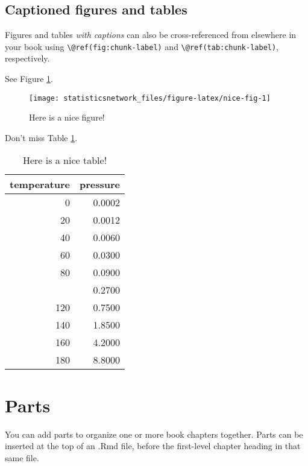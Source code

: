 \documentclass[
]{article}
\theoremstyle{definition}
\theoremstyle{definition}
\theoremstyle{definition}
\theoremstyle{definition}
\theoremstyle{remark}
\begin{document}
\hypertarget{captioned-figures-and-tables}{%
\subsection{Captioned figures and tables}\label{captioned-figures-and-tables}}

Figures and tables \emph{with captions} can also be cross-referenced from elsewhere in your book using \texttt{\textbackslash{}@ref(fig:chunk-label)} and \texttt{\textbackslash{}@ref(tab:chunk-label)}, respectively.

See Figure \ref{fig:nice-fig}.

\begin{figure}

{\centering \texttt{[image: statisticsnetwork\_files/figure-latex/nice-fig-1]} 

}

\caption{Here is a nice figure!}\label{fig:nice-fig}
\end{figure}

Don't miss Table \ref{tab:nice-tab}.

\begin{table}

\caption{\label{tab:nice-tab}Here is a nice table!}
\centering
\begin{tabular}[t]{rr}
\toprule
temperature & pressure\\
\midrule
0 & 0.0002\\
20 & 0.0012\\
40 & 0.0060\\
60 & 0.0300\\
80 & 0.0900\\
\addlinespace
100 & 0.2700\\
120 & 0.7500\\
140 & 1.8500\\
160 & 4.2000\\
180 & 8.8000\\
\bottomrule
\end{tabular}
\end{table}

\hypertarget{parts}{%
\section{Parts}\label{parts}}

You can add parts to organize one or more book chapters together. Parts can be inserted at the top of an .Rmd file, before the first-level chapter heading in that same file.
\end{document}
